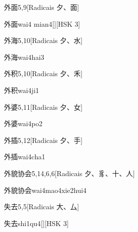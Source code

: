 \begin{entry}{外面}{5,9}[Radicais ⼣、⾯]
  \begin{phonetics}{外面}{wai4 mian4}[][HSK 3]
  \end{phonetics}
\end{entry}

\begin{entry}{外海}{5,10}[Radicais ⼣、⽔]
  \begin{phonetics}{外海}{wai4hai3}
  \end{phonetics}
\end{entry}

\begin{entry}{外积}{5,10}[Radicais ⼣、⽲]
  \begin{phonetics}{外积}{wai4ji1}
  \end{phonetics}
\end{entry}

\begin{entry}{外婆}{5,11}[Radicais ⼣、⼥]
  \begin{phonetics}{外婆}{wai4po2}
  \end{phonetics}
\end{entry}

\begin{entry}{外插}{5,12}[Radicais ⼣、⼿]
  \begin{phonetics}{外插}{wai4cha1}
  \end{phonetics}
\end{entry}

\begin{entry}{外貌协会}{5,14,6,6}[Radicais ⼣、⾘、⼗、⼈]
  \begin{phonetics}{外貌协会}{wai4mao4xie2hui4}
  \end{phonetics}
\end{entry}

\begin{entry}{失去}{5,5}[Radicais ⼤、⼛]
  \begin{phonetics}{失去}{shi1qu4}[][HSK 3]
  \end{phonetics}
\end{entry}

